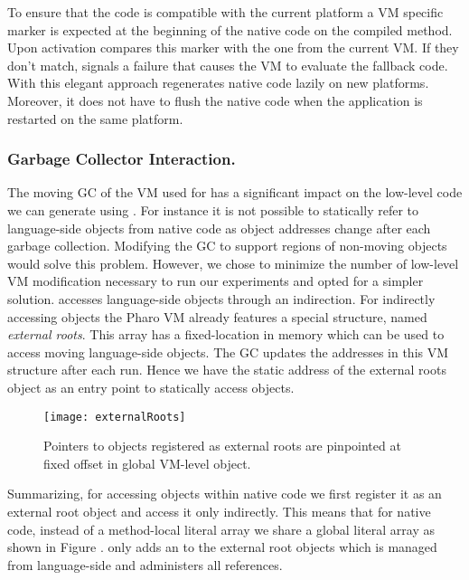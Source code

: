 To ensure that the code is compatible with the current platform a VM specific marker is expected at the beginning of the native code on the compiled method.
Upon activation \B compares this marker with the one from the current VM.
If they don't match, \B signals a failure that causes the VM to evaluate the fallback \ST code.
With this elegant approach \B regenerates native code lazily on new platforms.
Moreover, it does not have to flush the native code when the application is restarted on the same platform.

\subsubsection{Garbage Collector Interaction.}
The moving GC of the VM used for \PH has a significant impact on the low-level code we can generate using \B.
For instance it is not possible to statically refer to language-side objects from native code as object addresses change after each garbage collection.
Modifying the GC to support regions of non-moving objects would solve this problem.
However, we chose to minimize the number of low-level VM modification necessary to run our experiments and opted for a simpler solution.
\B accesses language-side objects through an indirection.
For indirectly accessing objects the Pharo VM already features a special structure, named \emph{external roots}.
This array has a fixed-location in memory which can be used to access moving language-side objects.
The GC updates the addresses in this VM structure after each run.
Hence we have the static address of the external roots object as an entry point to statically access \ST objects.
%
\vspace{-2mm}
\begin{figure}[ht]
	\centering
	\texttt{[image: externalRoots]}
	\caption{Pointers to objects registered as external roots are pinpointed at fixed offset in global VM-level object.
	}
\end{figure}
\vspace{-3mm}
%
Summarizing, for accessing \ST objects within native code we first register it as an external root object and access it only indirectly.
This means that for native code, instead of a method-local literal array we share a global literal array as shown in Figure . 
\B only adds an  to the external root objects which is managed from language-side and administers all references.

